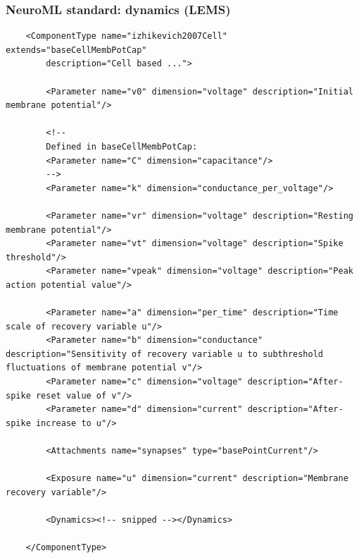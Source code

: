 \begin{frame}[fragile,c]
  \frametitle{NeuroML standard: dynamics (LEMS)}
  \begin{center}
    \begin{verbatim}
    <ComponentType name="izhikevich2007Cell" extends="baseCellMembPotCap"
        description="Cell based ...">

        <Parameter name="v0" dimension="voltage" description="Initial membrane potential"/>

        <!--
        Defined in baseCellMembPotCap:
        <Parameter name="C" dimension="capacitance"/>
        -->
        <Parameter name="k" dimension="conductance_per_voltage"/>

        <Parameter name="vr" dimension="voltage" description="Resting membrane potential"/>
        <Parameter name="vt" dimension="voltage" description="Spike threshold"/>
        <Parameter name="vpeak" dimension="voltage" description="Peak action potential value"/>

        <Parameter name="a" dimension="per_time" description="Time scale of recovery variable u"/>
        <Parameter name="b" dimension="conductance" description="Sensitivity of recovery variable u to subthreshold fluctuations of membrane potential v"/>
        <Parameter name="c" dimension="voltage" description="After-spike reset value of v"/>
        <Parameter name="d" dimension="current" description="After-spike increase to u"/>

        <Attachments name="synapses" type="basePointCurrent"/>

        <Exposure name="u" dimension="current" description="Membrane recovery variable"/>

        <Dynamics><!-- snipped --></Dynamics>

    </ComponentType>
    \end{verbatim}
  \end{center}
\end{frame}
